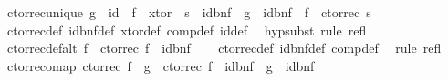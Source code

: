 \begin{isabellebody}
{\isafoldproof}%
%
\isadelimproof
\isanewline
%
\endisadelimproof
\isanewline
{}\isamarkupfalse%
\ ctor{\isacharunderscore}{\kern0pt}rec{\isacharunderscore}{\kern0pt}unique{\isacharcolon}{\kern0pt}\ {\isachardoublequoteopen}g\ {\isacharequal}{\kern0pt}\ id\ {\isasymLongrightarrow}\ f\ {\isasymcirc}\ xtor\ {\isacharequal}{\kern0pt}\ s\ {\isasymcirc}\ {\isacharparenleft}{\kern0pt}id{\isacharunderscore}{\kern0pt}bnf\ {\isasymcirc}\ g\ {\isasymcirc}\ id{\isacharunderscore}{\kern0pt}bnf{\isacharparenright}{\kern0pt}\ {\isasymLongrightarrow}\ f\ {\isacharequal}{\kern0pt}\ ctor{\isacharunderscore}{\kern0pt}rec\ s{\isachardoublequoteclose}\isanewline
%
\isadelimproof
\ \ %
\endisadelimproof
%
\isatagproof
{}\isamarkupfalse%
\ ctor{\isacharunderscore}{\kern0pt}rec{\isacharunderscore}{\kern0pt}def\ id{\isacharunderscore}{\kern0pt}bnf{\isacharunderscore}{\kern0pt}def\ xtor{\isacharunderscore}{\kern0pt}def\ comp{\isacharunderscore}{\kern0pt}def\ id{\isacharunderscore}{\kern0pt}def\ \isamarkupfalse%
\ hypsubst\ {\isacharparenleft}{\kern0pt}rule\ refl{\isacharparenright}{\kern0pt}%
\endisatagproof
{\isafoldproof}%
%
\isadelimproof
\isanewline
%
\endisadelimproof
\isanewline
{}\isamarkupfalse%
\ ctor{\isacharunderscore}{\kern0pt}rec{\isacharunderscore}{\kern0pt}def{\isacharunderscore}{\kern0pt}alt{\isacharcolon}{\kern0pt}\ {\isachardoublequoteopen}f\ {\isacharequal}{\kern0pt}\ ctor{\isacharunderscore}{\kern0pt}rec\ {\isacharparenleft}{\kern0pt}f\ {\isasymcirc}\ id{\isacharunderscore}{\kern0pt}bnf{\isacharparenright}{\kern0pt}{\isachardoublequoteclose}\isanewline
%
\isadelimproof
\ \ %
\endisadelimproof
%
\isatagproof
{}\isamarkupfalse%
\ ctor{\isacharunderscore}{\kern0pt}rec{\isacharunderscore}{\kern0pt}def\ id{\isacharunderscore}{\kern0pt}bnf{\isacharunderscore}{\kern0pt}def\ comp{\isacharunderscore}{\kern0pt}def\ \isamarkupfalse%
\ {\isacharparenleft}{\kern0pt}rule\ refl{\isacharparenright}{\kern0pt}%
\endisatagproof
{\isafoldproof}%
%
\isadelimproof
\isanewline
%
\endisadelimproof
\isanewline
{}\isamarkupfalse%
\ ctor{\isacharunderscore}{\kern0pt}rec{\isacharunderscore}{\kern0pt}o{\isacharunderscore}{\kern0pt}map{\isacharcolon}{\kern0pt}\ {\isachardoublequoteopen}ctor{\isacharunderscore}{\kern0pt}rec\ f\ {\isasymcirc}\ g\ {\isacharequal}{\kern0pt}\ ctor{\isacharunderscore}{\kern0pt}rec\ {\isacharparenleft}{\kern0pt}f\ {\isasymcirc}\ {\isacharparenleft}{\kern0pt}id{\isacharunderscore}{\kern0pt}bnf\ {\isasymcirc}\ g\ {\isasymcirc}\ id{\isacharunderscore}{\kern0pt}bnf{\isacharparenright}{\kern0pt}{\isacharparenright}{\kern0pt}{\isachardoublequoteclose}\isanewline

\end{isabellebody}
